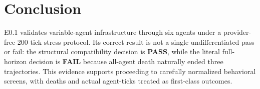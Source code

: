 \documentclass[11pt]{article}
\newcommand{\pass}{\textcolor{passgreen}{\textbf{PASS}}}
\newcommand{\fail}{\textcolor{failred}{\textbf{FAIL}}}
\begin{document}
\section{Conclusion}

E0.1 validates variable-agent infrastructure through six agents under a
provider-free 200-tick stress protocol.  Its correct result is not a single
undifferentiated pass or fail: the structural compatibility decision is
\pass{}, while the literal full-horizon decision is \fail{} because all-agent
death naturally ended three trajectories.  This evidence supports proceeding
to carefully normalized behavioral screens, with deaths and actual agent-ticks
treated as first-class outcomes.
\end{document}
